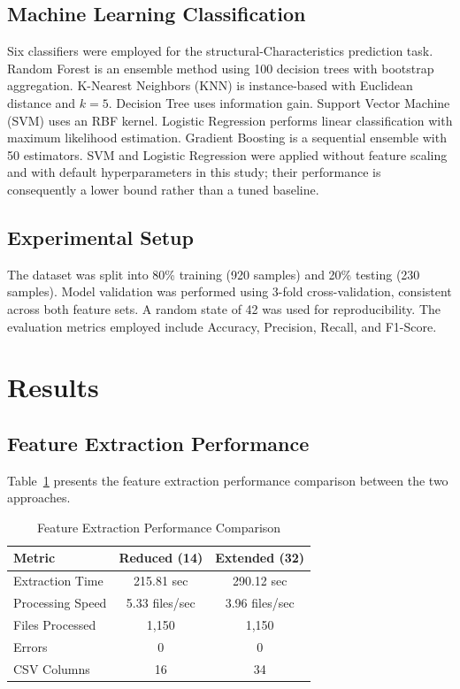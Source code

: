 \documentclass[conference,a4paper]{IEEEtran}
\begin{document}
\subsection{Machine Learning Classification}

Six classifiers were employed for the structural-Characteristics prediction task. Random Forest is an ensemble method using 100 decision trees with bootstrap aggregation. K-Nearest Neighbors (KNN) is instance-based with Euclidean distance and $k=5$. Decision Tree uses information gain. Support Vector Machine (SVM) uses an RBF kernel. Logistic Regression performs linear classification with maximum likelihood estimation. Gradient Boosting is a sequential ensemble with 50 estimators. SVM and Logistic Regression were applied without feature scaling and with default hyperparameters in this study; their performance is consequently a lower bound rather than a tuned baseline.

\subsection{Experimental Setup}

The dataset was split into 80\% training (920 samples) and 20\% testing (230 samples). Model validation was performed using 3-fold cross-validation, consistent across both feature sets. A random state of 42 was used for reproducibility. The evaluation metrics employed include Accuracy, Precision, Recall, and F1-Score.

\section{Results}

\subsection{Feature Extraction Performance}

Table~\ref{tab:extraction} presents the feature extraction performance comparison between the two approaches.

\begin{table}[!htbp]
\centering
\caption{Feature Extraction Performance Comparison}
\label{tab:extraction}
\begin{tabular}{lcc}
\toprule
\textbf{Metric} & \textbf{Reduced (14)} & \textbf{Extended (32)} \\
\midrule
Extraction Time & 215.81 sec & 290.12 sec \\
Processing Speed & 5.33 files/sec & 3.96 files/sec \\
Files Processed & 1,150 & 1,150 \\
Errors & 0 & 0 \\
CSV Columns & 16 & 34 \\
\bottomrule
\end{tabular}
\end{table}
\end{document}
